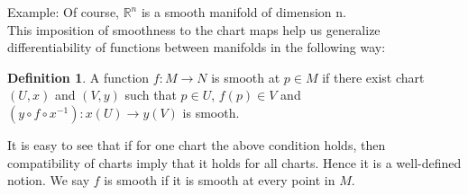 \documentclass[a4paper]{report}
\theoremstyle{definition}
\newtheorem{definition}{Definition}[section]
\theoremstyle{remark}
\begin{document}
		Example: Of course, $\mathbb{R}^n$ is a smooth manifold of dimension n.
			\\
		This imposition of smoothness to the chart maps help us generalize differentiability of functions between manifolds in the following way:
		\begin{definition}
			A function $f:M\to N$ is smooth at $p \in M$ if there exist chart $(U,x)$ and $(V,y)$ such that $p\in U$, $f(p) \in V$  and $(y\circ f\circ x^{-1}): x(U) \to y(V)$ is smooth. \end{definition}
		It is easy to see that if for one chart the above condition holds, then compatibility of charts imply that it holds for all charts. Hence it is a well-defined notion. We say $f$ is smooth if it is smooth at every point in $M$.
\end{document}
